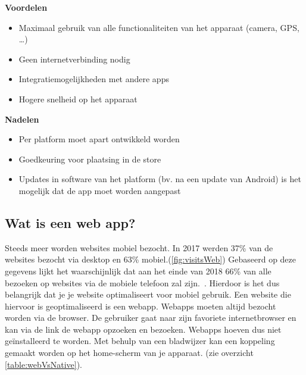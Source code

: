 \begin{minipage}[t]{0.5\textwidth}
	\textbf{Voordelen}
	\begin{itemize}  
		\item Maximaal gebruik van alle functionaliteiten van het apparaat (camera, GPS, \dots)
		\item Geen internetverbinding nodig
		\item Integratiemogelijkheden met andere apps
		\item Hogere snelheid op het apparaat
	\end{itemize}
\end{minipage}
\begin{minipage}[t]{0.5\textwidth}
		\textbf{Nadelen}
	\begin{itemize}  
		\item Per platform moet apart ontwikkeld worden
		\item Goedkeuring voor plaatsing in de store
		\item Updates in software van het platform (bv. na een update van Android) is het mogelijk dat de app moet worden aangepast
\end{itemize}
\end{minipage}


\subsection{Wat is een web app?}
Steeds meer worden websites mobiel bezocht. In 2017 werden 37\% van de websites bezocht via desktop en 63\% mobiel.(\ref{fig:visitsWeb}) Gebaseerd op deze gegevens lijkt het waarschijnlijk dat aan het einde van 2018 66\% van alle bezoeken op websites via de mobiele telefoon zal zijn.~\autocite{traffic}. Hierdoor is het dus belangrijk dat je je website optimaliseert voor mobiel gebruik. Een website die hiervoor is geoptimaliseerd is een webapp. Webapps moeten altijd bezocht worden via de browser. De gebruiker gaat naar zijn favoriete internetbrowser en kan via de link de webapp opzoeken en bezoeken. Webapps hoeven dus niet geïnstalleerd te worden. Met behulp van een bladwijzer kan een koppeling gemaakt worden op het home-scherm van je apparaat. (zie overzicht \ref{table:webVsNative}).


